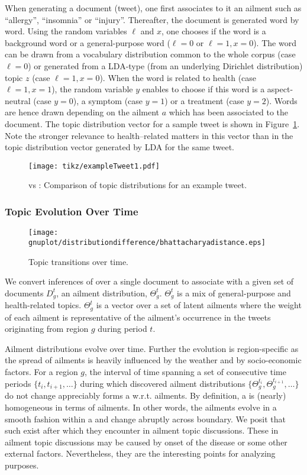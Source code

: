 When generating a document (tweet), one first
associates to it an ailment such as ``allergy'', ``insomnia'' or
``injury''. Thereafter, the document is generated word by
word. Using the random variables $\ell$ and $x$, one chooses if the
word is a background word or a general-purpose word ($\ell=0$ or $\ell=1,x=0$). The word can be
drawn from a vocabulary distribution common to the whole corpus (case
$\ell=0$) or generated from a LDA-type (from an underlying Dirichlet distribution)
 topic $z$ (case $\ell=1,x=0$). When the
word is related to health (case $\ell=1,x=1$), the random variable $y$
enables to choose if this word is a aspect-neutral (case $y=0$), a
symptom (case $y=1$) or a treatment (case $y=2$). Words are hence
drawn depending on the ailment $a$ which has been associated to the
document. The topic distribution vector for a sample tweet is shown 
in Figure~\ref{fig:ldavsatam}. Note the stronger relevance to 
health--related matters in this vector than in the topic distribution vector 
generated by LDA for the same tweet. 
\begin{figure}[t!]
\centering
\texttt{[image: tikz/exampleTweet1.pdf]}
\caption{\lda vs \atam: Comparison of topic distributions for an example tweet.}
\label{fig:ldavsatam}
\end{figure}

\subsubsection{Topic Evolution Over Time}
\begin{figure}[b!]
\centering
\texttt{[image: gnuplot/distributiondifference/bhattacharyadistance.eps]}
\caption{Topic transitions over time.}
\label{fig:ailmentsEvolve}
\end{figure}

We convert inferences of \atam over a single document to associate with a given set of documents $D_g^t$, an ailment
distribution, $\Theta_g^t$. $\Theta_g^t$ is a mix of general-purpose and health-related topics.
 $\Theta_g^t$ is a vector over a set of latent ailments where the weight of each ailment is representative of 
the ailment's occurrence in the tweets originating from region $g$ 
during period $t$. 


Ailment distributions evolve over time. Further the evolution is
region-specific as the spread of ailments is heavily influenced by the
weather and by socio-economic factors. For a region $g$, the interval
of time spanning a set of consecutive time periods
$\{t_i,t_{i+1},\ldots\}$ during which discovered ailment distributions 
$\{\Theta_g^{t_i},\Theta_g^{t_{i+1}},\ldots\}$
do not change appreciably forms a \texttt{\emph{\season}} w.r.t. ailments. By definition, a \season is (nearly) homogeneous in terms
of ailments. In other words, the ailments evolve in a smooth fashion
within a \season and change abruptly across \season boundary. We posit that such \seasons exist after which they encounter \changes in ailment topic discussions.
These \changes in ailment topic discussions 
may be caused by onset of the disease or some other external factors.
Nevertheless, they are the interesting points for analyzing purposes.

